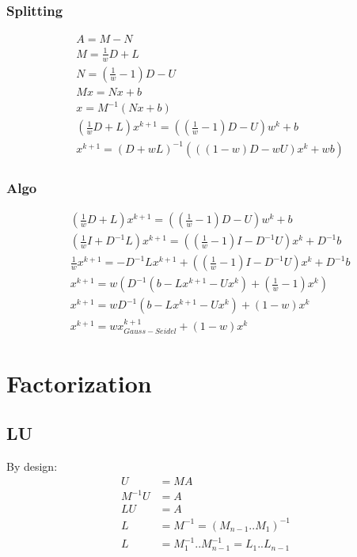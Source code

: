 \documentclass[8pt,letter]{article}
\begin{document}
\begin{multicols*}{2}
    \subsubsection{Splitting}
    \begin{align*}
      & A = M - N\\
      & M = \frac{1}{w} D + L\\
      & N = (\frac{1}{w} - 1)D - U\\
      & Mx = Nx + b\\
      & x = M^{-1}(Nx + b)\\
      & (\frac{1}{w} D + L)x^{k+1} = ((\frac{1}{w}-1) D - U) w^k +b\\
      & x^{k+1} = (D+wL)^{-1} (((1-w)D - wU)x^k + wb)
    \end{align*}

    \subsubsection{Algo}
    \begin{align*}
      & (\frac{1}{w} D + L)x^{k+1} = ((\frac{1}{w}-1) D - U) w^k +b\\
      & (\frac{1}{w}I + D^{-1}L)x^{k+1} = ((\frac{1}{w} - 1)I - D^{-1}U)x^k + D^{-1}b\\
      & \frac{1}{w}x^{k+1} = -D^{-1}L x^{k+1} + ((\frac{1}{w} - 1)I - D^{-1}U)x^k + D^{-1}b\\
      & x^{k+1} = w(D^{-1}(b-Lx^{k+1}-Ux^k)+(\frac{1}{w}-1)x^k)\\
      & x^{k+1} = wD^{-1}(b-Lx^{k+1}-Ux^k)+(1-w)x^k\\
      & x^{k+1} = w x^{k+1}_{Gauss-Seidel} + (1-w)x^k
    \end{align*}
    
    \vfill\null
    \pagebreak
    
    \section{Factorization}
    
    \subsection{LU}
    
    By design:
    \begin{align*}
      U&=MA\\
      M^{-1} U &= A\\
      LU &= A\\
      L &= M^{-1} = (M_{n-1} .. M_1)^{-1}\\
      L &= M_1^{-1}..M_{n-1}^{-1} = L_1 .. L_{n-1}
    \end{align*}


\end{multicols*}
\end{document}
